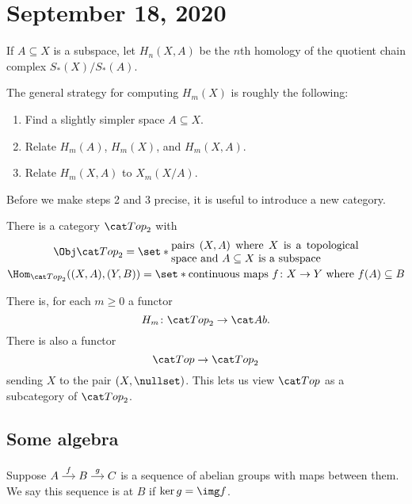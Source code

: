 \documentclass{standalone}
\begin{document}
\chapter{September 18, 2020}

\begin{definition}
  If \(A \subseteq X\) is a subspace, let \(H_n(X, A)\) be
  the \(n\)th homology of the quotient chain complex \(S_*(X)/S_*(A)\).
\end{definition}

The general strategy for computing \(H_m(X)\) is roughly the following:
\begin{enumerate}[nosep]
  \item Find a slightly simpler space \(A \subseteq X\).
  \item Relate \(H_m(A)\), \(H_m(X)\), and \(H_m(X, A)\).
  \item Relate \(H_m(X, A)\) to \(X_m(X/A)\).
\end{enumerate}

Before we make steps 2 and 3 precise, it is useful to introduce a new category.
\begin{definition}
  There is a category \(\cTop_2\) with
  \begin{gather*}
    \Obj \cTop_2 = \set*{\parbox{6cm}{%
      pairs \((X, A)\) where \(X\) is a topological space
      and \(A \subseteq X\) is a subspace
    }} \\
    \Hom_{\cTop_2}((X, A), (Y, B)) = \set*{\text{%
        continuous maps \(f \colon X \to Y\) where \(f(A) \subseteq B\)%
    }}
  \end{gather*}
\end{definition}

There is, for each \(m \geq 0\) a functor
\[
  H_m \colon \cTop_2 \to \cAb.
\]
There is also a functor
\[
  \cTop \to \cTop_2
\]
sending \(X\) to the pair \((X, \nullset)\). This lets us view \(\cTop\) as a
subcategory of \(\cTop_2\).

\section{Some algebra}
\begin{definition}
  Suppose
  \(
    \begin{tikzcd}[cramped, sep=small]
    	A \ar[r, "f"] &
    	B \ar[r, "g"] &
    	C
    \end{tikzcd}
  \)
  is a sequence of abelian groups with maps between them. We say this sequence
  is  at \(B\) if \(\ker g = \img f\).
\end{definition}
\end{document}
